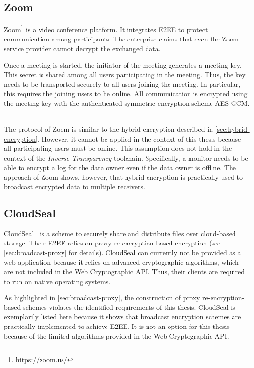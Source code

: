 \documentclass[../main.tex]{subfiles}
\begin{document}
\subsection{Zoom}
Zoom\footnote{\url{https://zoom.us/}} is a video conference platform. 
It integrates E2EE to protect communication among participants.
The enterprise claims that even the Zoom service provider cannot decrypt the exchanged data.~\cite{Blum2020}

Once a meeting is started, the initiator of the meeting generates a meeting key.
This secret is shared among all users participating in the meeting.
Thus, the key needs to be transported securely to all users joining the meeting.
In particular, this requires the joining users to be online.
All communication is encrypted using the meeting key with the authenticated symmetric encryption scheme AES-GCM.
~\cite{Isobe2021}

The protocol of Zoom is similar to the hybrid encryption described in \cref{sec:hybrid-encryption}.
However, it cannot be applied in the context of this thesis because all participating users must be online.
This assumption does not hold in the context of the \emph{Inverse Transparency} toolchain.
Specifically, a monitor needs to be able to encrypt a log for the data owner even if the data owner is offline.
The approach of Zoom shows, however, that hybrid encryption is practically used to broadcast encrypted data to multiple receivers.

\subsection{CloudSeal}
CloudSeal~\cite{Xiong2012} is a scheme to securely share and distribute files over cloud-based storage.
Their E2EE relies on proxy re-encryption-based encryption (see \cref{sec:broadcast-proxy} for details).
CloudSeal can currently not be provided as a web application because it relies on advanced cryptographic algorithms, which are not included in the Web Cryptographic API.
Thus, their clients are required to run on native operating systems.~\cite{Xiong2012}

As highlighted in \cref{sec:broadcast-proxy}, the construction of proxy re-encryption-based schemes violates the identified requirements of this thesis.
CloudSeal is exemplarily listed here because it shows that broadcast encryption schemes are practically implemented to achieve E2EE.
It is not an option for this thesis because of the limited algorithms provided in the Web Cryptographic API.
\end{document}
